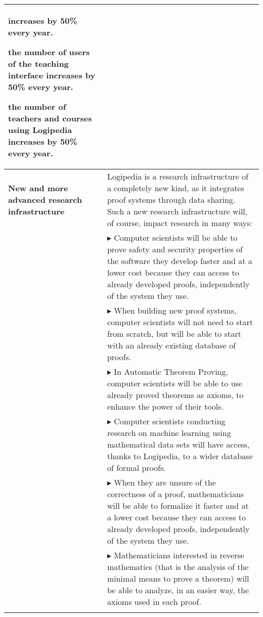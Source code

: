 \begin{longtable}{|p{}|p{}|}
\begin{compactitem}
  increases by 50\% every year.
\item the number of users of the teaching interface 
  increases by 50\% every year.
\item the number of teachers and courses using Logipedia
  increases by 50\% every year.
\end{compactitem}
\\
\hline
{\bf New and more advanced research infrastructure}
&
Logipedia is a research
infrastructure of a completely new kind, as it integrates proof systems
through data sharing. Such a new research infrastructure will, of
course, impact research in many ways:
\\
&
$\blacktriangleright$ Computer scientists
will be able to prove safety and security
  properties of the software they develop faster and at a lower cost
  because they can access to already developed proofs, independently
  of the system they use.
\\
&
$\blacktriangleright$ When building new proof systems, computer scientists will not
  need to start from scratch, but will be able to start with an already
  existing database of proofs.
\\
&
$\blacktriangleright$ In Automatic Theorem Proving, computer scientists will be able
  to use already proved theorems as axioms, to enhance the power of
  their tools.
\\
&
$\blacktriangleright$ Computer scientists conducting research on machine learning
using mathematical data sets will have access, thanks to Logipedia,
to a wider database of formal proofs.
\\
&
$\blacktriangleright$ When they are unsure of the correctness of a proof,
  mathematicians will be able to formalize it faster and at a lower
  cost because they can access to already developed proofs,
  independently of the system they use.
\\
&
$\blacktriangleright$
Mathematicians interested in reverse mathematics (that is the analysis
of the minimal means to prove a theorem) will be able to analyze, in
an easier way, the axioms used in each proof.
\\
&


\end{longtable}
